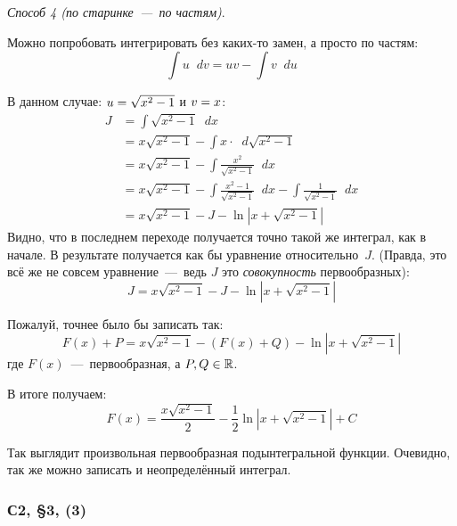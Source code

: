 \documentclass[a4paper,12pt]{article}
\newcommand{\diff}{\mathop{}\!d}
\begin{document}
\begin{example}
    \medskip

    \noindent
    \emph{Способ 4 (по старинке~---~по частям)}.

    Можно попробовать интегрировать без каких-то замен, а просто по частям:
    \[
      \int u \diff v = uv - \int v \diff u
    \]

    В данном случае: $u \hm= \sqrt{x^2 - 1}$ и $v \hm= x$:
    \begin{equation}
    \begin{split}
      J &= \int \sqrt{x^2 - 1} \diff x\\
        &= x \sqrt{x^2 - 1} - \int x \cdot \diff \sqrt{x^2 - 1}\\
        &= x\sqrt{x^2 - 1} - \int \frac{x^2}{\sqrt{x^2 - 1}} \diff x\\
        &= x\sqrt{x^2 - 1} - \int \frac{x^2 - 1}{\sqrt{x^2 - 1}} \diff x - \int \frac{1}{\sqrt{x^2 - 1}} \diff x\\
        &= x\sqrt{x^2 - 1} - J - \ln|x + \sqrt{x^2 - 1}|
    \end{split}
    \end{equation}
    Видно, что в последнем переходе получается точно такой же интеграл, как в начале.
    В результате получается как бы уравнение относительно~$J$.
    (Правда, это всё же не совсем уравнение~---~ведь $J$ это \emph{совокупность} первообразных):
    \[
      J = x\sqrt{x^2 - 1} - J - \ln\left|x + \sqrt{x^2 - 1}\right|
    \]

    Пожалуй, точнее было бы записать так:
    \[
      F(x) + P = x\sqrt{x^2 - 1} - (F(x) + Q) - \ln\left|x + \sqrt{x^2 - 1}\right|
    \]
    где $F(x)$~---~первообразная, а $P, Q \hm\in \RR$.

    В итоге получаем:
    \[
      F(x) = \frac{x\sqrt{x^2 - 1}}{2} - \frac{1}{2}\ln\left|x + \sqrt{x^2 - 1}\right| + C
    \]

    Так выглядит произвольная первообразная подынтегральной функции.
    Очевидно, так же можно записать и неопределённый интеграл.
  \end{example}


  \subsubsection{С2, \S 3, (3)}
\end{document}
